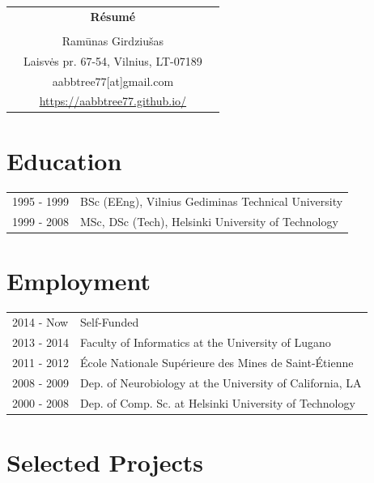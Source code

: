 \documentclass[a4paper,12pt]{article}
\begin{document}
\thispagestyle{empty}

%
\begin{center}
\begin{tabular}{ccc}
&\Large \textbf{Résumé}&\\
\\
& Ramūnas Girdziušas &\\  
& Laisvės pr. 67-54, Vilnius, LT-07189 &\\
& aabbtree77[at]gmail.com &\\
& \url{https://aabbtree77.github.io/} &\\
\end{tabular}
\end{center}
%
\section*{Education}
%
\begin{tabularx}{\textwidth}{@{}p{3cm}X@{}}
1995 - 1999  & BSc (EEng), Vilnius Gediminas Technical University\\
1999 - 2008  &  MSc, DSc (Tech), Helsinki University of Technology\\
\end{tabularx}
%
\section*{Employment}
%
\begin{tabularx}{\textwidth}{@{}p{3cm}X@{}}
2014 - Now & Self-Funded \\

2013 - 2014 &
Faculty of Informatics at the University of Lugano\\

2011 - 2012 &
École Nationale Supérieure des Mines de Saint-Étienne\\

2008 - 2009 &
Dep. of Neurobiology at the University of California, LA \\

2000 - 2008 &
Dep. of Comp. Sc. at Helsinki University of Technology\\
\end{tabularx}

\section*{Selected Projects}
\label{sect:pubs}
\end{document}
